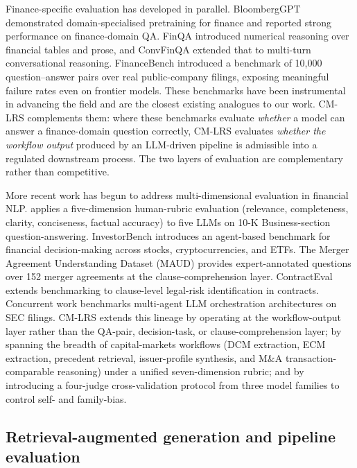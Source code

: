 \documentclass[11pt]{article}
\begin{document}
Finance-specific evaluation has developed in parallel. BloombergGPT \citep{wu2023bloomberggpt} demonstrated domain-specialised pretraining for finance and reported strong performance on finance-domain QA. FinQA \citep{chen2021finqa} introduced numerical reasoning over financial tables and prose, and ConvFinQA \citep{chen2022convfinqa} extended that to multi-turn conversational reasoning. FinanceBench \citep{islam2023financebench} introduced a benchmark of 10{,}000 question--answer pairs over real public-company filings, exposing meaningful failure rates even on frontier models. These benchmarks have been instrumental in advancing the field and are the closest existing analogues to our work. CM-LRS complements them: where these benchmarks evaluate \emph{whether} a model can answer a finance-domain question correctly, CM-LRS evaluates \emph{whether the workflow output} produced by an LLM-driven pipeline is admissible into a regulated downstream process. The two layers of evaluation are complementary rather than competitive.

More recent work has begun to address multi-dimensional evaluation in financial NLP. \citet{mohsin2025financialnlp} applies a five-dimension human-rubric evaluation (relevance, completeness, clarity, conciseness, factual accuracy) to five LLMs on 10-K Business-section question-answering. InvestorBench \citep{li2025investorbench} introduces an agent-based benchmark for financial decision-making across stocks, cryptocurrencies, and ETFs. The Merger Agreement Understanding Dataset (MAUD) \citep{wang2023maud} provides expert-annotated questions over 152 merger agreements at the clause-comprehension layer. ContractEval \citep{liu2025contracteval} extends benchmarking to clause-level legal-risk identification in contracts. Concurrent work \citep{kulkarni2026findoc} benchmarks multi-agent LLM orchestration architectures on SEC filings. CM-LRS extends this lineage by operating at the workflow-output layer rather than the QA-pair, decision-task, or clause-comprehension layer; by spanning the breadth of capital-markets workflows (DCM extraction, ECM extraction, precedent retrieval, issuer-profile synthesis, and M\&A transaction-comparable reasoning) under a unified seven-dimension rubric; and by introducing a four-judge cross-validation protocol from three model families to control self- and family-bias.

\subsection{Retrieval-augmented generation and pipeline evaluation}
\end{document}
